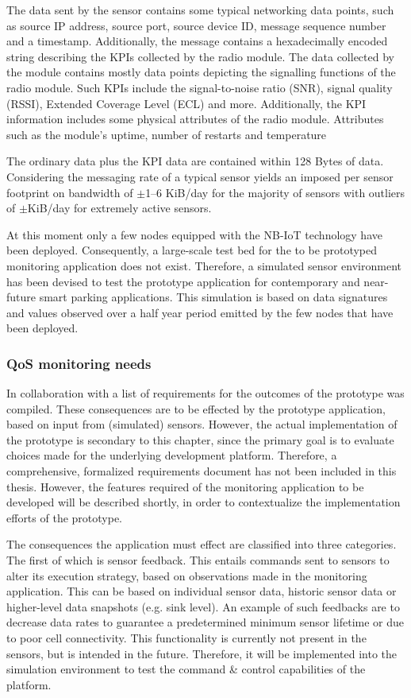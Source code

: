 The data sent by the sensor contains some typical networking data points, such as source IP address, source port, source device ID, message sequence number and a timestamp. Additionally, the message contains a hexadecimally encoded string describing the KPIs collected by the \ublox radio module. The data collected by the \ublox module contains mostly data points depicting the signalling functions of the radio module. Such KPIs include the signal-to-noise ratio (SNR), signal quality (RSSI), Extended Coverage Level (ECL) and more. Additionally, the KPI information includes some physical attributes of the radio module. Attributes such as the module's uptime, number of restarts and temperature

The ordinary data plus the \ublox KPI data are contained within 128 Bytes of data. Considering the messaging rate of a typical sensor yields an imposed per sensor footprint on bandwidth of $\pm$1--6 KiB/day for the majority of sensors with outliers of $\pm$KiB/day for extremely active sensors.

At this moment only a few nodes equipped with the NB-IoT technology have been deployed. Consequently, a large-scale test bed for the to be prototyped monitoring application does not exist. Therefore, a simulated sensor environment has been devised to test the prototype application for contemporary and near-future smart parking applications. This simulation is based on data signatures and values observed over a half year period emitted by the few nodes that have been deployed.

\subsubsection{QoS monitoring needs}
In collaboration with \nedap\idsystems a list of requirements for the outcomes of the prototype was compiled. These consequences are to be effected by the prototype application, based on input from (simulated) sensors. However, the actual implementation of the prototype is secondary to this chapter, since the primary goal is to evaluate choices made for the underlying development platform. Therefore, a comprehensive, formalized requirements document has not been included in this thesis. However, the features required of the monitoring application to be developed will be described shortly, in order to contextualize the implementation efforts of the prototype.

The consequences the application must effect are classified into three categories. The first of which is sensor feedback. This entails commands sent to sensors to alter its execution strategy, based on observations made in the monitoring application. This can be based on individual sensor data, historic sensor data or higher-level data snapshots (e.g. sink level). An example of such feedbacks are to decrease data rates to guarantee a predetermined minimum sensor lifetime or due to poor cell connectivity. This functionality is currently not present in the \nedap sensors, but is intended in the future. Therefore, it will be implemented into the simulation environment to test the command \& control capabilities of the platform.

